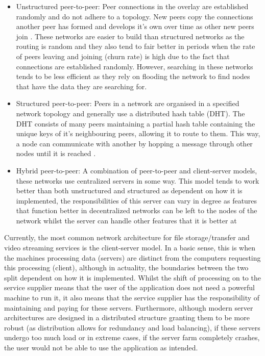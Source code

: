 \documentclass[]{report}
\begin{document}
			\begin{itemize}
				\item Unstructured peer-to-peer:
				Peer connections in the overlay are established randomly and do not adhere to a topology. New peers copy the connections another peer has formed and develops it's own over time as other new peers join  \cite{P2P overlay networks}. These networks are easier to build than structured networks as the routing is random and they also tend to fair better in periods when the rate of peers leaving and joining (churn rate) is high due to the fact that connections are established randomly. However, searching in these networks tends to be less efficient as they rely on flooding the network to find nodes that have the data they are searching for.
				\item Structured peer-to-peer:
				Peers in a network are organised in a specified network topology and generally use a distributed hash table (DHT). The DHT consists of many peers maintaining a partial hash table containing the unique keys of it's neighbouring peers, allowing it to route to them. This way, a node can communicate with another by hopping a message through other nodes until it is reached \cite{P2P overlay networks}. 
				\item Hybrid peer-to-peer:
				A combination of  peer-to-peer and client-server models, these networks use centralized servers in some way.  This model tends to work better than both unstructured and structured as dependent on how it is implemented, the responsibilities of this server can vary in degree as features that function better in decentralized networks can be left to the nodes of the network whilst the server can handle other features that it is better at \cite{Hybrid P2P network}
			\end{itemize}
						
			Currently, the most common network architecture for file storage/transfer and video streaming services is the client-server model. In a basic sense, this is when the machines processing data (servers) are distinct from the computers requesting this processing (client), although in actuality, the boundaries between the two split dependent on how it is implemented. Whilst the shift of processing on to the service supplier means that the user of the application does not need a powerful machine to run it, it also means that the service supplier has the responsibility of maintaining and paying for these servers. Furthermore, although modern server architectures are designed in a distributed structure granting them to be more robust (as distribution allows for redundancy and load balancing), if these servers undergo too much load or in extreme cases, if the server farm completely crashes, the user would not be able to use the application as intended.
			
\end{document}
